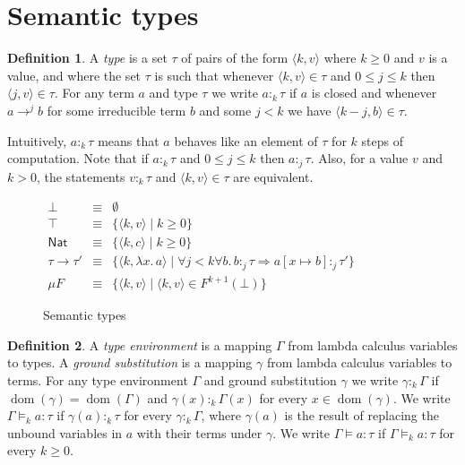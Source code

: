 \documentclass[12pt,a4paper,draft]{article}
\theoremstyle{definition}
\newtheorem{definition}{Definition}
\theoremstyle{plain}
\newcommand{\abstr}[2]{\ensuremath{\lambda{#1}.\,{#2}}}
\newcommand{\Nat}{\ensuremath{\mathsf{Nat}}}
\newcommand{\pair}[1]{\ensuremath{\langle{#1}\rangle}}
\DeclareMathOperator{\dom}{dom}
\begin{document}
\section{Semantic types}
\label{sec:Semantic_types}


\begin{definition} \label{def:Type}
  A \emph{type} is a set $\tau$ of pairs of the form $\pair{k,v}$ where $k \ge 0$ and $v$ is a value, and
  where the set $\tau$ is such that whenever $\pair{k,v} \in \tau$ and $0 \le j \le k$ then $\pair{j,v} \in \tau$.
  For any term $a$ and type $\tau$ we write $a :_k \tau$ if $a$ is closed and whenever $a \to^j b$ for some
  irreducible term $b$ and some $j < k$ we have $\pair{k-j,b} \in \tau$.
\end{definition}

Intuitively, $a :_k \tau$ means that $a$ behaves like an element of $\tau$ for $k$ steps of computation. Note
that if $a :_k \tau$ and $0 \le j \le k$ then $a :_j \tau$. Also, for a value $v$ and $k > 0$, the statements
$v :_k \tau$ and $\pair{k,v} \in \tau$ are equivalent.

\begin{figure}[htb]
  \centering
  $\begin{array}{rcl}
    \bot &\equiv& \emptyset \\
    \top &\equiv& \{ \pair{k,v} \mid k \ge 0 \} \\
    \Nat &\equiv& \{ \pair{k,c} \mid k \ge 0 \} \\
    \tau \to \tau' &\equiv& \{ \pair{k,\abstr{x}{a}} \mid \forall j < k \forall b.\, b :_j \tau \Longrightarrow a[x \mapsto b] :_j \tau' \} \\
    \mu F &\equiv& \{ \pair{k,v} \mid \pair{k,v} \in F^{k+1}(\bot) \}
  \end{array}$
  \caption{Semantic types}
  \label{fig:Semantic_types}
\end{figure}

\begin{definition} \label{def:Typing}
  A \emph{type environment} is a mapping $\Gamma$ from lambda calculus variables to types. A
  \emph{ground substitution} is a mapping $\gamma$ from lambda calculus variables to terms. For
  any type environment $\Gamma$ and ground substitution $\gamma$ we write $\gamma :_k \Gamma$ if
  $\dom(\gamma) = \dom(\Gamma)$ and $\gamma(x) :_k \Gamma(x)$ for every $x \in \dom(\gamma)$. We
  write $\Gamma \models_k a : \tau$ if $\gamma(a) :_k \tau$ for every $\gamma :_k \Gamma$,
  where $\gamma(a)$ is the result of replacing the unbound variables in $a$ with their terms under
  $\gamma$. We write $\Gamma \models a : \tau$ if $\Gamma \models_k a : \tau$ for every $k \ge 0$.
\end{definition}
\end{document}
